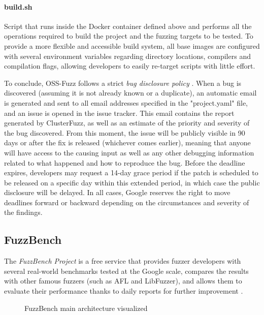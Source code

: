 \paragraph{build.sh} Script that runs inside the Docker container defined above and performs all the operations required to build the project and the fuzzing targets to be tested. To provide a more flexible and accessible build system, all base images are configured with several environment variables regarding directory locations, compilers and compilation flags, allowing developers to easily re-target scripts with little effort.


\newpage
To conclude, OSS-Fuzz follows a strict \textit{bug disclosure policy} \cite{bug_disclosure}.
When a bug is discovered (assuming it is not already known or a duplicate), an automatic email is generated and sent to all email addresses specified in the "project.yaml" file, and an issue is opened in the issue tracker. This email contains the report generated by ClusterFuzz, as well as an estimate of the priority and severity of the bug discovered. From this moment, the issue will be publicly visible in 90 days or after the fix is released (whichever comes earlier), meaning that anyone will have access to the causing input as well as any other debugging information related to what happened and how to reproduce the bug. Before the deadline expires, developers may request a 14-day grace period if the patch is scheduled to be released on a specific day within this extended period, in which case the public disclosure will be delayed. In all cases, Google reserves the right to move deadlines forward or backward depending on the circumstances and severity of the findings.




\subsection{FuzzBench}
The \textit{FuzzBench Project} \cite{fuzzbench_paper} is a free service that provides fuzzer developers with several real-world benchmarks tested at the Google scale, compares the results with other famous fuzzers (such as AFL and LibFuzzer), and allows them to evaluate their performance thanks to daily reports for further improvement \cite{fuzzbench_docs}.

\begin{figure}[h]
\caption{FuzzBench main architecture visualized \cite{fuzzbench_docs}}
\label{fig:fuzzbench_architecture}
\end{figure}

